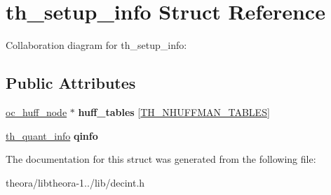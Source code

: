 \hypertarget{structth__setup__info}{\section{th\+\_\+setup\+\_\+info Struct Reference}
\label{structth__setup__info}
}


Collaboration diagram for th\+\_\+setup\+\_\+info\+:
\subsection*{Public Attributes}
\begin{DoxyCompactItemize}
\item 
\hypertarget{structth__setup__info_a621a81508f99488333b6809e62f74c77}{\hyperlink{structoc__huff__node}{oc\+\_\+huff\+\_\+node} $\ast$ {\bfseries huff\+\_\+tables} \mbox{[}\hyperlink{theora_2libtheora-1_81_81_2include_2theora_2codec_8h_a49bf449eae33c5320f0c308f32c6ae42}{T\+H\+\_\+\+N\+H\+U\+F\+F\+M\+A\+N\+\_\+\+T\+A\+B\+L\+E\+S}\mbox{]}}\label{structth__setup__info_a621a81508f99488333b6809e62f74c77}

\item 
\hypertarget{structth__setup__info_aaf4dc687d1f54d5635547ed070c79647}{\hyperlink{structth__quant__info}{th\+\_\+quant\+\_\+info} {\bfseries qinfo}}\label{structth__setup__info_aaf4dc687d1f54d5635547ed070c79647}

\end{DoxyCompactItemize}


The documentation for this struct was generated from the following file\+:\begin{DoxyCompactItemize}
\item 
theora/libtheora-\/1../lib/decint.\+h\end{DoxyCompactItemize}
